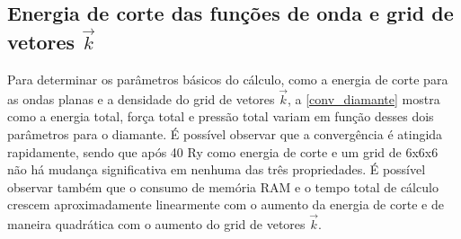 \documentclass[
	12pt,				%
	openright,			%
	twoside,			%
	a4paper,			%
	chapter=TITLE,		%
	english,			%
	french,				%
	spanish,			%
	brazil				%
	]{abntex2}
\begin{document}
\begin{apendicesenv}

\partapendices


\chapter{}
\label{ap:conv}
	
	\section{Energia de corte das funções de onda e grid de vetores $\vec{k}$}
		Para determinar os parâmetros básicos do cálculo, como a energia de corte para as ondas planas e a densidade do grid de vetores  $\vec{k}$, a \autoref{conv_diamante} mostra como a energia total, força total e pressão total variam em função desses dois parâmetros para o diamante. É possível observar que a convergência é atingida rapidamente, sendo que após 40 Ry como energia de corte e um grid de 6x6x6 não há mudança significativa em nenhuma das três propriedades. É possível observar também que o consumo de memória RAM e o tempo total de cálculo crescem aproximadamente linearmente com o aumento da energia de corte e de maneira quadrática com o aumento do grid de vetores $\vec{k}$.
	

\end{apendicesenv}
\end{document}
